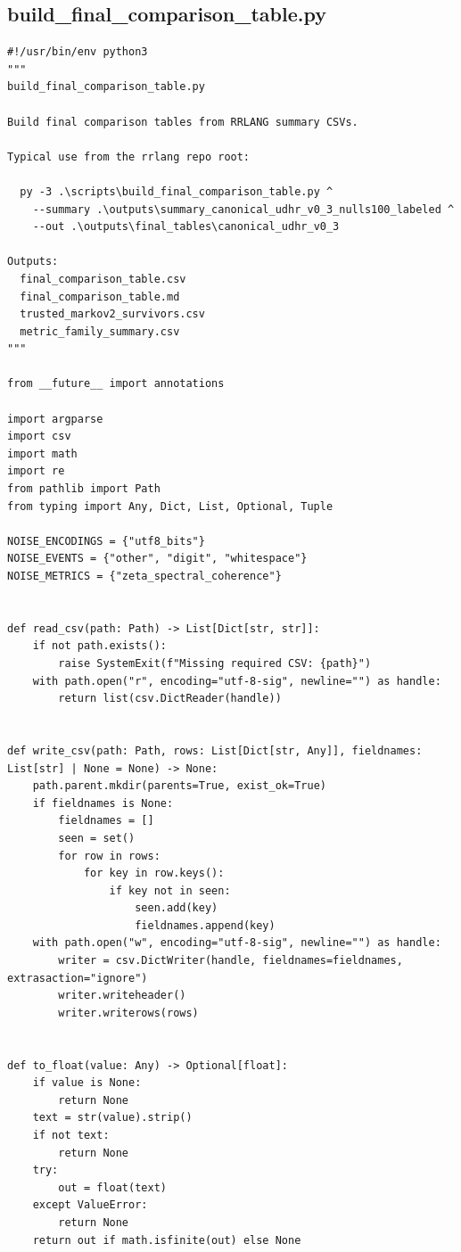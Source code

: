 \documentclass[11pt,a4paper]{article}
\begin{document}
\subsection{build\_final\_comparison\_table.py}
\begin{lstlisting}
#!/usr/bin/env python3
"""
build_final_comparison_table.py

Build final comparison tables from RRLANG summary CSVs.

Typical use from the rrlang repo root:

  py -3 .\scripts\build_final_comparison_table.py ^
    --summary .\outputs\summary_canonical_udhr_v0_3_nulls100_labeled ^
    --out .\outputs\final_tables\canonical_udhr_v0_3

Outputs:
  final_comparison_table.csv
  final_comparison_table.md
  trusted_markov2_survivors.csv
  metric_family_summary.csv
"""

from __future__ import annotations

import argparse
import csv
import math
import re
from pathlib import Path
from typing import Any, Dict, List, Optional, Tuple

NOISE_ENCODINGS = {"utf8_bits"}
NOISE_EVENTS = {"other", "digit", "whitespace"}
NOISE_METRICS = {"zeta_spectral_coherence"}


def read_csv(path: Path) -> List[Dict[str, str]]:
    if not path.exists():
        raise SystemExit(f"Missing required CSV: {path}")
    with path.open("r", encoding="utf-8-sig", newline="") as handle:
        return list(csv.DictReader(handle))


def write_csv(path: Path, rows: List[Dict[str, Any]], fieldnames: List[str] | None = None) -> None:
    path.parent.mkdir(parents=True, exist_ok=True)
    if fieldnames is None:
        fieldnames = []
        seen = set()
        for row in rows:
            for key in row.keys():
                if key not in seen:
                    seen.add(key)
                    fieldnames.append(key)
    with path.open("w", encoding="utf-8-sig", newline="") as handle:
        writer = csv.DictWriter(handle, fieldnames=fieldnames, extrasaction="ignore")
        writer.writeheader()
        writer.writerows(rows)


def to_float(value: Any) -> Optional[float]:
    if value is None:
        return None
    text = str(value).strip()
    if not text:
        return None
    try:
        out = float(text)
    except ValueError:
        return None
    return out if math.isfinite(out) else None



\end{lstlisting}
\end{document}
